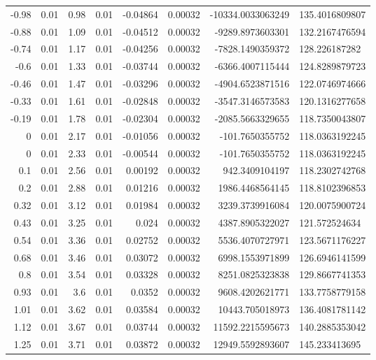 \documentclass[a4paper]{article}
\begin{document}
\begin{table}[htbp]
\begin{tabular}{rlrlrlrl}
    -0.98 & 0.01 & 0.98 & 0.01 & -0.04864 & 0.00032 & -10334.0033063249 & 135.4016809807 \\
    -0.88 & 0.01 & 1.09 & 0.01 & -0.04512 & 0.00032 & -9289.8973603301  & 132.2167476594 \\
    -0.74 & 0.01 & 1.17 & 0.01 & -0.04256 & 0.00032 & -7828.1490359372  & 128.226187282  \\
    -0.6  & 0.01 & 1.33 & 0.01 & -0.03744 & 0.00032 & -6366.4007115444  & 124.8289879723 \\
    -0.46 & 0.01 & 1.47 & 0.01 & -0.03296 & 0.00032 & -4904.6523871516  & 122.0746974666 \\
    -0.33 & 0.01 & 1.61 & 0.01 & -0.02848 & 0.00032 & -3547.3146573583  & 120.1316277658 \\
    -0.19 & 0.01 & 1.78 & 0.01 & -0.02304 & 0.00032 & -2085.5663329655  & 118.7350043807 \\
    0     & 0.01 & 2.17 & 0.01 & -0.01056 & 0.00032 & -101.7650355752   & 118.0363192245 \\
    0     & 0.01 & 2.33 & 0.01 & -0.00544 & 0.00032 & -101.7650355752   & 118.0363192245 \\
    0.1   & 0.01 & 2.56 & 0.01 & 0.00192  & 0.00032 & 942.3409104197    & 118.2302742768 \\
    0.2   & 0.01 & 2.88 & 0.01 & 0.01216  & 0.00032 & 1986.4468564145   & 118.8102396853 \\
    0.32  & 0.01 & 3.12 & 0.01 & 0.01984  & 0.00032 & 3239.3739916084   & 120.0075900724 \\
    0.43  & 0.01 & 3.25 & 0.01 & 0.024    & 0.00032 & 4387.8905322027   & 121.572524634  \\
    0.54  & 0.01 & 3.36 & 0.01 & 0.02752  & 0.00032 & 5536.4070727971   & 123.5671176227 \\
    0.68  & 0.01 & 3.46 & 0.01 & 0.03072  & 0.00032 & 6998.1553971899   & 126.6946141599 \\
    0.8   & 0.01 & 3.54 & 0.01 & 0.03328  & 0.00032 & 8251.0825323838   & 129.8667741353 \\
    0.93  & 0.01 & 3.6  & 0.01 & 0.0352   & 0.00032 & 9608.4202621771   & 133.7758779158 \\
    1.01  & 0.01 & 3.62 & 0.01 & 0.03584  & 0.00032 & 10443.705018973   & 136.4081781142 \\
    1.12  & 0.01 & 3.67 & 0.01 & 0.03744  & 0.00032 & 11592.2215595673  & 140.2885353042 \\
    1.25  & 0.01 & 3.71 & 0.01 & 0.03872  & 0.00032 & 12949.5592893607  & 145.233413695  \\

\end{tabular}
\end{table}
\end{document}
